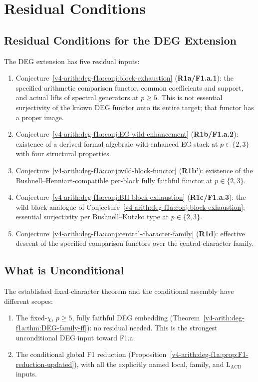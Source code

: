 \section{Residual Conditions}
\label{v4-arith:deg-f1a:residuals}

\subsection{Residual Conditions for the DEG Extension}

The DEG extension has five residual inputs:

\begin{enumerate}
\item Conjecture~\ref{v4-arith:deg-f1a:conj:block-exhaustion}
(\textbf{R1a/F1.a.1}): the specified arithmetic comparison functor,
common coefficients and support, and actual lifts of spectral generators
at \(p\geq5\). This is not essential surjectivity of the known DEG
functor onto its entire target; that functor has a proper image.
\item Conjecture~\ref{v4-arith:deg-f1a:conj:EG-wild-enhancement}
(\textbf{R1b/F1.a.2}): existence of a derived formal algebraic
wild-enhanced EG stack at \(p\in\{2,3\}\) with four structural
properties.
\item Conjecture~\ref{v4-arith:deg-f1a:conj:wild-block-functor}
(\textbf{R1b'}): existence of the Bushnell--Henniart-compatible
per-block fully faithful functor at \(p\in\{2,3\}\).
\item Conjecture~\ref{v4-arith:deg-f1a:conj:BH-block-exhaustion}
(\textbf{R1c/F1.a.3}): the wild-block analogue of
Conjecture~\ref{v4-arith:deg-f1a:conj:block-exhaustion}; essential
surjectivity per Bushnell--Kutzko type at \(p\in\{2,3\}\).
\item Conjecture~\ref{v4-arith:deg-f1a:conj:central-character-family}
(\textbf{R1d}): effective descent of the specified comparison functors over the
central-character family.
\end{enumerate}

\subsection{What is Unconditional}

The established fixed-character theorem and the conditional assembly
have different scopes:

\begin{enumerate}
\item The fixed-\(\chi\), \(p\geq 5\), fully faithful DEG embedding
(Theorem~\ref{v4-arith:deg-f1a:thm:DEG-family-ff}): no residual needed.
This is the strongest unconditional DEG input toward F1.a.
\item The conditional global F1 reduction
(Proposition~\ref{v4-arith:deg-f1a:prop:F1-reduction-updated}), with all the explicitly named local, family, and
\(\mathrm{L}_{\mathrm{ACD}}\) inputs.
\end{enumerate}

